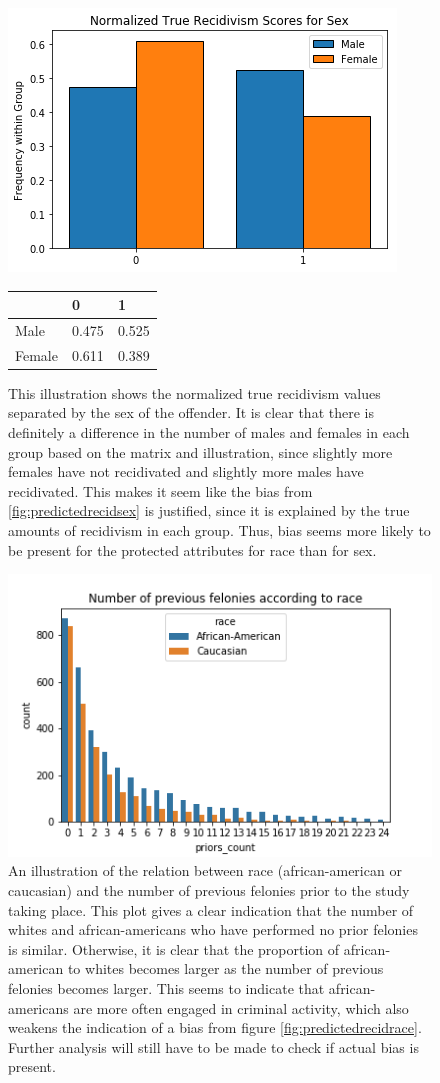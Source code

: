 \documentclass[11pt, fleqn, titlepage]{article}
\begin{document}
	\begin{figure}[H]
		\centering
		\includegraphics[width=0.5\linewidth]{imgs/true_normalized_sex}
		\begin{table}[H]
			\centering
			\begin{tabular}{|l|l|l|}
				\hline
				& 0   & 1  \\ \hline
				Male     & 0.475 & 0.525  \\ \hline
				Female   & 0.611 & 0.389  \\ \hline
			\end{tabular}
		\end{table}
		\caption{This illustration shows the normalized true recidivism values separated by the sex of the offender. It is clear that there is definitely a difference in the number of males and females in each group based on the matrix and illustration, since slightly more females have not recidivated and slightly more males have recidivated. This makes it seem like the bias from \ref{fig:predictedrecidsex} is justified, since it is explained by the true amounts of recidivism in each group. Thus, bias seems more likely to be present for the protected attributes for race than for sex.}
		\label{fig:truerecid}
	\end{figure}
	
	\begin{figure}[H]
		\centering
		\includegraphics[width=0.5\linewidth]{imgs/proirs}
		\caption{An illustration of the relation between race (african-american or caucasian) and the number of previous felonies prior to the study taking place. This plot gives a clear indication that the number of whites and african-americans who have performed no prior felonies is similar. Otherwise, it is clear that the proportion of african-american to whites becomes larger as the number of previous felonies becomes larger. This seems to indicate that african-americans are more often engaged in criminal activity, which also weakens the indication of a bias from figure \ref{fig:predictedrecidrace}. Further analysis will still have to be made to check if actual bias is present.}
		\label{fig:proirs}
	\end{figure}
	
\end{document}
